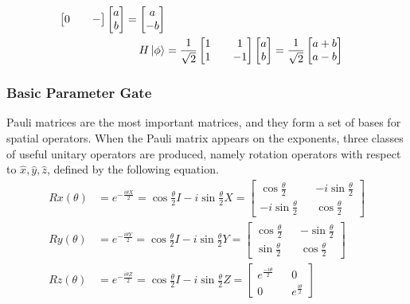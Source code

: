 \begin{align*}
\begin{bmatrix}
    0 && -
\end{bmatrix}\begin{bmatrix}
    a\\
    b
\end{bmatrix}=\begin{bmatrix}
    a\\
    -b
\end{bmatrix} %
\\
H\ket{\phi}&=\frac{1}{\sqrt{2}}\begin{bmatrix}
    1 && 1\\
    1 && -1
\end{bmatrix}\begin{bmatrix}
    a\\
    b
\end{bmatrix}=\frac{1}{\sqrt{2}}\begin{bmatrix}
    a+b\\
    a-b
\end{bmatrix} %
\end{align*}

\subsubsection{Basic Parameter Gate}
Pauli matrices are the most important matrices, and they form a set of bases for spatial operators. When the Pauli matrix appears on the exponents, three classes of useful unitary operators are produced, namely rotation operators with respect to $\hat{x}, \hat{y}, \hat{z}$, defined by the following equation.\\
\begin{align*}
Rx(\theta)&=e^{-\frac{i\theta X}{2}}=\cos{\frac{\theta}{2}}I-i\sin{\frac{\theta}{2}}X=\begin{bmatrix}
        \cos{\frac{\theta}{2}} && -i\sin{\frac{\theta}{2}}\\
        -i\sin{\frac{\theta}{2}} && \cos{\frac{\theta}{2}}
    \end{bmatrix} %
\\
Ry(\theta)&=e^{-\frac{i\theta Y}{2}}=\cos{\frac{\theta}{2}}I-i\sin{\frac{\theta}{2}}Y=\begin{bmatrix}
    \cos{\frac{\theta}{2}} && -\sin{\frac{\theta}{2}}\\
    \sin{\frac{\theta}{2}} && \cos{\frac{\theta}{2}}
    \end{bmatrix} %
\\
Rz(\theta)&=e^{-\frac{i\theta Z}{2}}=\cos{\frac{\theta}{2}}I-i\sin{\frac{\theta}{2}}Z=\begin{bmatrix}
    e^{\frac{-i\theta}{2}} && 0\\
    0 &&  e^{\frac{i\theta}{2}}
    \end{bmatrix} %
\end{align*}
    

